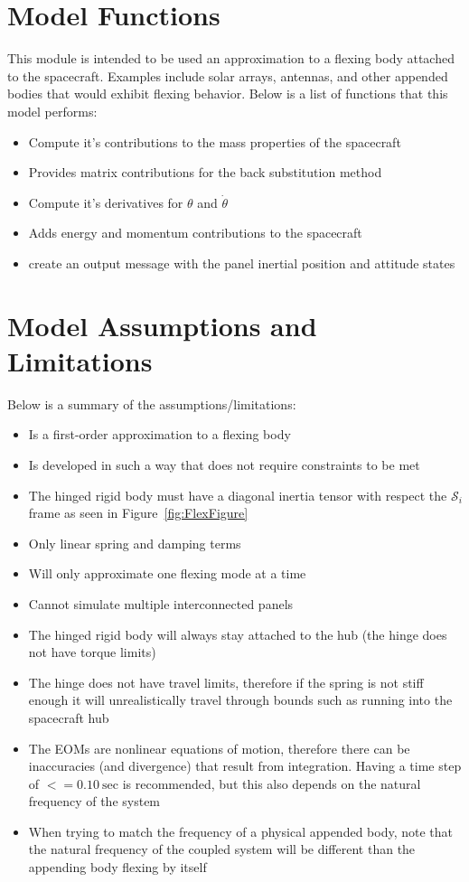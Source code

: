 \section{Model Functions}

This module is intended to be used an approximation to a flexing body attached to the spacecraft. Examples include solar arrays, antennas, and other appended bodies that would exhibit flexing behavior. Below is a list of functions that this model performs:

\begin{itemize}
	\item Compute it's contributions to the mass properties of the spacecraft
	\item Provides matrix contributions for the back substitution method
	\item Compute it's derivatives for $\theta$ and $\dot{\theta}$
	\item Adds energy and momentum contributions to the spacecraft
	\item create an output message with the panel inertial position and attitude states
\end{itemize}

\section{Model Assumptions and Limitations}
Below is a summary of the assumptions/limitations:

\begin{itemize}
	\item Is a first-order approximation to a flexing body
	\item Is developed in such a way that does not require constraints to be met
	\item The hinged rigid body must have a diagonal inertia tensor with respect the $\mathcal{S}_i$ frame as seen in Figure~\ref{fig:FlexFigure}
	\item Only linear spring and damping terms
	\item Will only approximate one flexing mode at a time
	\item Cannot simulate multiple interconnected panels
	\item The hinged rigid body will always stay attached to the hub (the hinge does not have torque limits)
	\item The hinge does not have travel limits, therefore if the spring is not stiff enough it will unrealistically travel through bounds such as running into the spacecraft hub
	\item The EOMs are nonlinear equations of motion, therefore there can be inaccuracies (and divergence) that result from integration. Having a time step of $<= 0.10\ \text{sec}$ is recommended, but this also depends on the natural frequency of the system
	\item When trying to match the frequency of a physical appended body, note that the natural frequency of the coupled system will be different than the appending body flexing by itself
\end{itemize}
